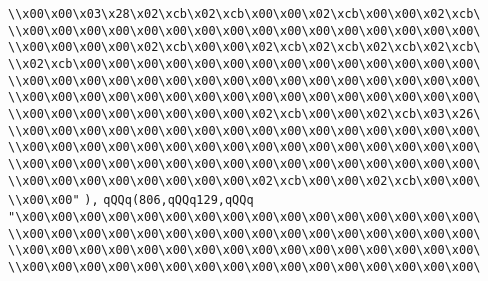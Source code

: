 \verb|\\x00\x00\x03\x28\x02\xcb\x02\xcb\x00\x00\x02\xcb\x00\x00\x02\xcb\|\newline
\verb|\\x00\x00\x00\x00\x00\x00\x00\x00\x00\x00\x00\x00\x00\x00\x00\x00\|\newline
\verb|\\x00\x00\x00\x00\x02\xcb\x00\x00\x02\xcb\x02\xcb\x02\xcb\x02\xcb\|\newline
\verb|\\x02\xcb\x00\x00\x00\x00\x00\x00\x00\x00\x00\x00\x00\x00\x00\x00\|\newline
\verb|\\x00\x00\x00\x00\x00\x00\x00\x00\x00\x00\x00\x00\x00\x00\x00\x00\|\newline
\verb|\\x00\x00\x00\x00\x00\x00\x00\x00\x00\x00\x00\x00\x00\x00\x00\x00\|\newline
\verb|\\x00\x00\x00\x00\x00\x00\x00\x00\x02\xcb\x00\x00\x02\xcb\x03\x26\|\newline
\verb|\\x00\x00\x00\x00\x00\x00\x00\x00\x00\x00\x00\x00\x00\x00\x00\x00\|\newline
\verb|\\x00\x00\x00\x00\x00\x00\x00\x00\x00\x00\x00\x00\x00\x00\x00\x00\|\newline
\verb|\\x00\x00\x00\x00\x00\x00\x00\x00\x00\x00\x00\x00\x00\x00\x00\x00\|\newline
\verb|\\x00\x00\x00\x00\x00\x00\x00\x00\x02\xcb\x00\x00\x02\xcb\x00\x00\|\newline
\verb|\\x00\x00"|\newline
\verb|),|\newline
\verb|qQQq(806,qQQq129,qQQq|\newline
\verb|"\x00\x00\x00\x00\x00\x00\x00\x00\x00\x00\x00\x00\x00\x00\x00\x00\|\newline
\verb|\\x00\x00\x00\x00\x00\x00\x00\x00\x00\x00\x00\x00\x00\x00\x00\x00\|\newline
\verb|\\x00\x00\x00\x00\x00\x00\x00\x00\x00\x00\x00\x00\x00\x00\x00\x00\|\newline
\verb|\\x00\x00\x00\x00\x00\x00\x00\x00\x00\x00\x00\x00\x00\x00\x00\x00\|\newline
